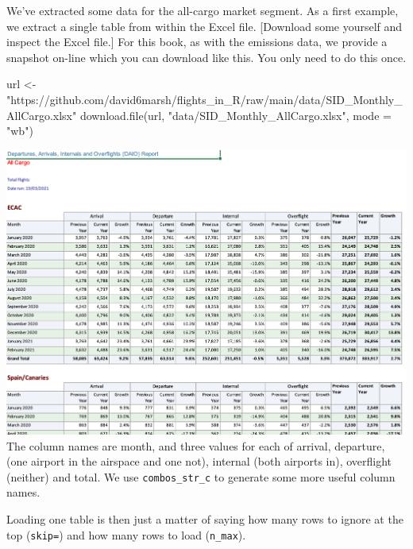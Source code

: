 \documentclass[
]{book}
\newenvironment{Shaded}{\begin{snugshade}}{\end{snugshade}}
\newcommand{\AttributeTok}[1]{\textcolor[rgb]{0.77,0.63,0.00}{#1}}
\newcommand{\FunctionTok}[1]{\textcolor[rgb]{0.00,0.00,0.00}{#1}}
\newcommand{\NormalTok}[1]{#1}
\newcommand{\OtherTok}[1]{\textcolor[rgb]{0.56,0.35,0.01}{#1}}
\newcommand{\StringTok}[1]{\textcolor[rgb]{0.31,0.60,0.02}{#1}}
\begin{document}
We've extracted some data for the all-cargo market segment. As a first example, we extract a single table from within the Excel file. {[}Download some yourself and inspect the Excel file.{]} For this book, as with the emissions data, we provide a snapshot on-line which you can download like this. You only need to do this once.

\begin{Shaded}
\begin{Highlighting}[]
\NormalTok{url }\OtherTok{\textless{}{-}} \StringTok{"https://github.com/david6marsh/flights\_in\_R/raw/main/data/SID\_Monthly\_AllCargo.xlsx"}
\FunctionTok{download.file}\NormalTok{(url, }\StringTok{"data/SID\_Monthly\_AllCargo.xlsx"}\NormalTok{, }\AttributeTok{mode =} \StringTok{"wb"}\NormalTok{) }
\end{Highlighting}
\end{Shaded}

\includegraphics{images/SID_monthly_excel_snapshot.png}
The column names are month, and three values for each of arrival, departure, (one airport in the airspace and one not), internal (both airports in), overflight (neither) and total. We use \texttt{combos\_str\_c} to generate some more useful column names.

Loading one table is then just a matter of saying how many rows to ignore at the top (\texttt{skip=}) and how many rows to load (\texttt{n\_max}).
\end{document}
